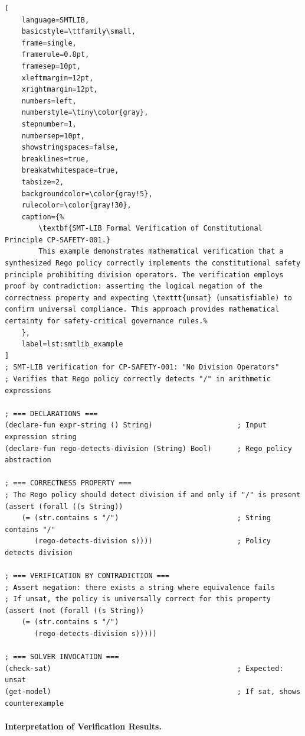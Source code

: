 \documentclass[manuscript,screen,9pt]{acmart}
\begin{document}
\begin{lstlisting}[
    language=SMTLIB,
    basicstyle=\ttfamily\small,
    frame=single,
    framerule=0.8pt,
    framesep=10pt,
    xleftmargin=12pt,
    xrightmargin=12pt,
    numbers=left,
    numberstyle=\tiny\color{gray},
    stepnumber=1,
    numbersep=10pt,
    showstringspaces=false,
    breaklines=true,
    breakatwhitespace=true,
    tabsize=2,
    backgroundcolor=\color{gray!5},
    rulecolor=\color{gray!30},
    caption={%
        \textbf{SMT-LIB Formal Verification of Constitutional Principle CP-SAFETY-001.}
        This example demonstrates mathematical verification that a synthesized Rego policy correctly implements the constitutional safety principle prohibiting division operators. The verification employs proof by contradiction: asserting the logical negation of the correctness property and expecting \texttt{unsat} (unsatisfiable) to confirm universal compliance. This approach provides mathematical certainty for safety-critical governance rules.%
    },
    label=lst:smtlib_example
]
; SMT-LIB verification for CP-SAFETY-001: "No Division Operators"
; Verifies that Rego policy correctly detects "/" in arithmetic expressions

; === DECLARATIONS ===
(declare-fun expr-string () String)                    ; Input expression string
(declare-fun rego-detects-division (String) Bool)      ; Rego policy abstraction

; === CORRECTNESS PROPERTY ===
; The Rego policy should detect division if and only if "/" is present
(assert (forall ((s String))
    (= (str.contains s "/")                            ; String contains "/"
       (rego-detects-division s))))                    ; Policy detects division

; === VERIFICATION BY CONTRADICTION ===
; Assert negation: there exists a string where equivalence fails
; If unsat, the policy is universally correct for this property
(assert (not (forall ((s String))
    (= (str.contains s "/")
       (rego-detects-division s)))))

; === SOLVER INVOCATION ===
(check-sat)                                            ; Expected: unsat
(get-model)                                            ; If sat, shows counterexample
\end{lstlisting}

\paragraph{Interpretation of Verification Results.}
\end{document}

